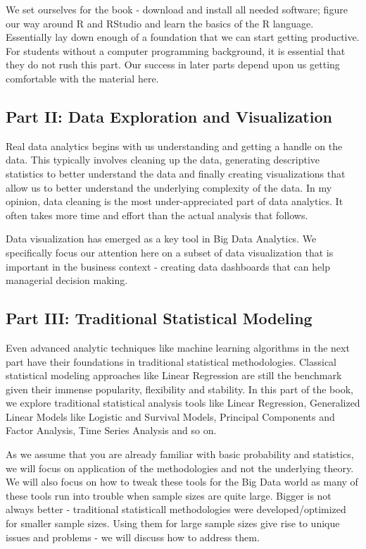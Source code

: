 \documentclass[
]{krantz}
\begin{document}
We set ourselves for the book - download and install all needed software; figure our way around R and RStudio and learn the basics of the R language. Essentially lay down enough of a foundation that we can start getting productive. For students without a computer programming background, it is essential that they do not rush this part. Our success in later parts depend upon us getting comfortable with the material here.

\hypertarget{part-ii-data-exploration-and-visualization}{%
\subsection*{Part II: Data Exploration and Visualization}\label{part-ii-data-exploration-and-visualization}}


Real data analytics begins with us understanding and getting a handle on the data. This typically involves cleaning up the data, generating descriptive statistics to better understand the data and finally creating visualizations that allow us to better understand the underlying complexity of the data. In my opinion, data cleaning is the most under-appreciated part of data analytics. It often takes more time and effort than the actual analysis that follows.

Data visualization has emerged as a key tool in Big Data Analytics. We specifically focus our attention here on a subset of data visualization that is important in the business context - creating data dashboards that can help managerial decision making.

\hypertarget{part-iii-traditional-statistical-modeling}{%
\subsection*{Part III: Traditional Statistical Modeling}\label{part-iii-traditional-statistical-modeling}}


Even advanced analytic techniques like machine learning algorithms in the next part have their foundations in traditional statistical methodologies. Classical statistical modeling approaches like Linear Regression are still the benchmark given their immense popularity, flexibility and stability. In this part of the book, we explore traditional statistical analysis tools like Linear Regression, Generalized Linear Models like Logistic and Survival Models, Principal Components and Factor Analysis, Time Series Analysis and so on.

As we assume that you are already familiar with basic probability and statistics, we will focus on application of the methodologies and not the underlying theory. We will also focus on how to tweak these tools for the Big Data world as many of these tools run into trouble when sample sizes are quite large. Bigger is not always better - traditional statisticall methodologies were developed/optimized for smaller sample sizes. Using them for large sample sizes give rise to unique issues and problems - we will discuss how to address them.
\end{document}
